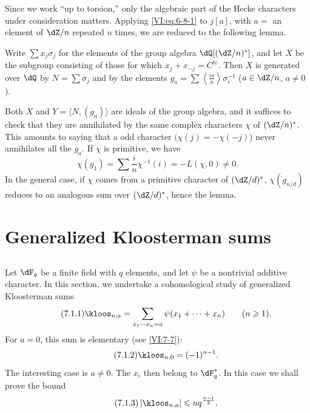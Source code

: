 Since we work ``up to torsion,'' only the algebraic part of the 
Hecke characters under consideration matters. Applying \eqref{VI:eq:6-8-1} to 
$j[a]$, with $a=$ an element of $\dZ/n$ repeated $n$ times, we 
are reduced to the following lemma.





\begin{lemma_}\label{VI:6-12}
Write $\sum x_j \sigma_j$ for the elements of the group algebra 
  $\dQ[(\dZ/n)^\ast]$, and let $X$ be the subgroup consisting of those for which 
$x_j+x_{-j}=C^{\underline{t e}}$. Then $X$ is generated over $\dQ$ by 
$N=\sum \sigma_j$ and by the elements 
  $g_a=\sum \left\langle \frac{i a}{n}\right\rangle \sigma_i^{-1}$ 
($a\in \dZ/n$, $a\ne 0$). 
\end{lemma_}

Both $X$ and $Y=\langle N,(g_a)\rangle$ are ideals of the group 
algebra, and it suffices to check that they are annihilated by the same 
complex characters $\chi$ of $(\dZ/n)^\ast$. This amounts to saying that a 
odd character $(\chi(j)=-\chi(-j)$) never annihilates all the $g_a$. If 
$\chi$ is primitive, we have 
\[
  \chi(g_1) = \sum \frac i n \chi^{-1}(i) = -L(\chi,0)\ne 0 \text{.} 
\]
In the general case, if $\chi$ comes from a primitive character of 
  $(\dZ/d)^\ast$, $\chi(g_{n/d})$ reduces to an analogous sum over 
  $(\dZ/d)^\ast$, hence the lemma. 










\section{Generalized Kloosterman sums}\label{VI:7}





\subsection{}\label{VI:7-1}

Let $\dF_q$ be a finite field with $q$ elements, and let $\psi$ be a nontrivial 
additive character. In this section, we undertake a cohomological study of 
generalized Kloosterman sums 
\begin{equation*}\tag{7.1.1}\label{VI:eq:7-1-1}
  \kloos_{n,a} = \sum_{x_1\dotsm x_n = a} \psi(x_1+\cdots + x_n) \qquad (n\geqslant 1) \text{.} 
\end{equation*}
For $a=0$, this sum is elementary (see \ref{VI:7-7}): 
\begin{equation*}\tag{7.1.2}\label{VI:eq:7-1-2}
  \kloos_{n,0} = (-1)^{n-1} \text{.} 
\end{equation*}
The interesting case is $a\ne 0$. The $x_i$ then belong to 
$\dF_q^\ast$. In this case we shall prove the bound 
\begin{equation*}\tag{7.1.3}\label{VI:eq:7-1-3}
  \left|\kloos_{n,a}\right| \leqslant n q^{\frac{n-1}{2}} \text{.} 
\end{equation*}

